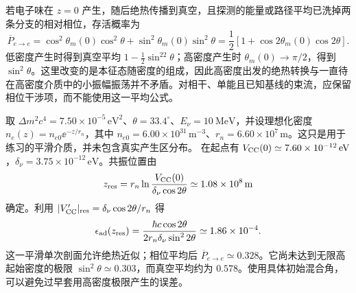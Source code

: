 若电子味在 $z=0$ 产生，随后绝热传播到真空，且探测的能量或路径平均已洗掉两条分支的相对相位，存活概率为
\begin{equation}
 \overline P_{e\to e}
 =\cos^2\theta_m(0)\cos^2\theta+\sin^2\theta_m(0)\sin^2\theta
 =\frac12[1+\cos2\theta_m(0)\cos2\theta].
 \label{eq:sm-matter-averaged-survival}
\end{equation}
低密度产生时得到真空平均 $1-\tfrac12\sin^22\theta$；高密度产生时 $\theta_m(0)\to\pi/2$，得到 $\sin^2\theta$。这里改变的是本征态随密度的组成，因此高密度出发的绝热转换与一直待在高密度介质中的小振幅振荡并不矛盾。对相干、单能且已知基线的束流，应保留相位干涉项，而不能使用这一平均公式。

\begin{exbox}[指数剖面的绝热性检查]
取 $\Delta m^2c^4=7.50\times10^{-5}\,\mathrm{eV^2}$、$\theta=33.4^\circ$、$E_\nu=\SI{10}{\mega\electronvolt}$，并设理想化密度 $n_e(z)=n_{e0}\ee^{-z/r_n}$，其中 $n_{e0}=6.00\times10^{31}\,\mathrm{m^{-3}}$、$r_n=6.60\times10^7\,\mathrm m$。这只是用于练习的平滑介质，并未包含真实产生区分布。
在起点有 $V_{\rm CC}(0)\simeq7.60\times10^{-12}\,\mathrm{eV}$，$\delta_\nu=3.75\times10^{-12}\,\mathrm{eV}$。共振位置由
\begin{equation*}
 z_{\rm res}=r_n\ln\frac{V_{\rm CC}(0)}{\delta_\nu\cos2\theta}
 \simeq1.08\times10^8\,\mathrm m
\end{equation*}
确定。利用 $|V_{\rm CC}'|_{\rm res}=\delta_\nu\cos2\theta/r_n$ 得
\begin{equation*}
 \epsilon_{\rm ad}(z_{\rm res})
 =\frac{\hbar c\cos2\theta}{2r_n\delta_\nu\sin^22\theta}
 \simeq1.86\times10^{-4}.
\end{equation*}
这一平滑单次剖面允许绝热近似；相位平均后 $\overline P_{e\to e}\simeq0.328$。它尚未达到无限高起始密度的极限 $\sin^2\theta\simeq0.303$，而真空平均约为 $0.578$。使用具体初始混合角，可以避免过早套用高密度极限产生的误差。
\end{exbox}

